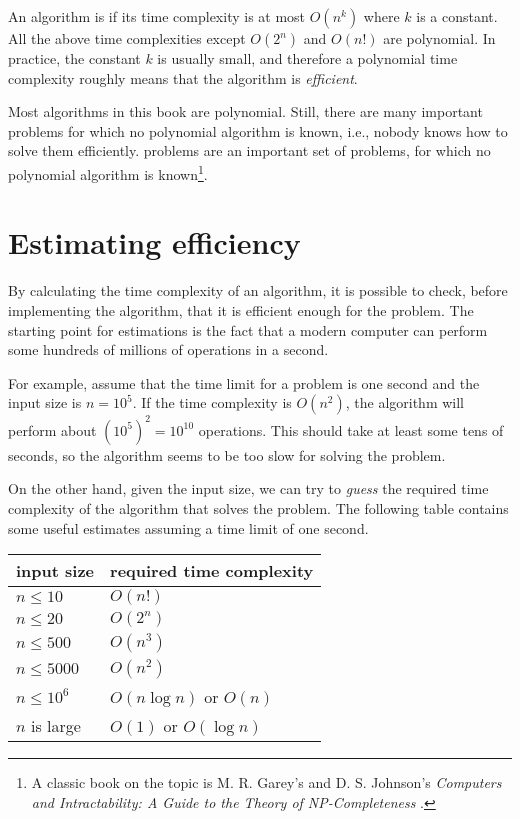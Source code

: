 An algorithm is 
if its time complexity is at most $O(n^k)$
where $k$ is a constant.
All the above time complexities except
$O(2^n)$ and $O(n!)$ are polynomial.
In practice, the constant $k$ is usually small,
and therefore a polynomial time complexity
roughly means that the algorithm is \emph{efficient}.


Most algorithms in this book are polynomial.
Still, there are many important problems for which
no polynomial algorithm is known, i.e.,
nobody knows how to solve them efficiently.
 problems are an important set
of problems, for which no polynomial algorithm
is known\footnote{A classic book on the topic is
M. R. Garey's and D. S. Johnson's
\emph{Computers and Intractability: A Guide to the Theory
of NP-Completeness} \cite{gar79}.}.

\section{Estimating efficiency}

By calculating the time complexity of an algorithm,
it is possible to check, before
implementing the algorithm, that it is
efficient enough for the problem.
The starting point for estimations is the fact that
a modern computer can perform some hundreds of
millions of operations in a second.

For example, assume that the time limit for
a problem is one second and the input size is $n=10^5$.
If the time complexity is $O(n^2)$,
the algorithm will perform about $(10^5)^2=10^{10}$ operations.
This should take at least some tens of seconds,
so the algorithm seems to be too slow for solving the problem.

On the other hand, given the input size,
we can try to \emph{guess}
the required time complexity of the algorithm
that solves the problem.
The following table contains some useful estimates
assuming a time limit of one second.

\begin{center}
\begin{tabular}{ll}
input size & required time complexity \\
\hline
$n \le 10$ & $O(n!)$ \\
$n \le 20$ & $O(2^n)$ \\
$n \le 500$ & $O(n^3)$ \\
$n \le 5000$ & $O(n^2)$ \\
$n \le 10^6$ & $O(n \log n)$ or $O(n)$ \\
$n$ is large & $O(1)$ or $O(\log n)$ \\
\end{tabular}
\end{center}

